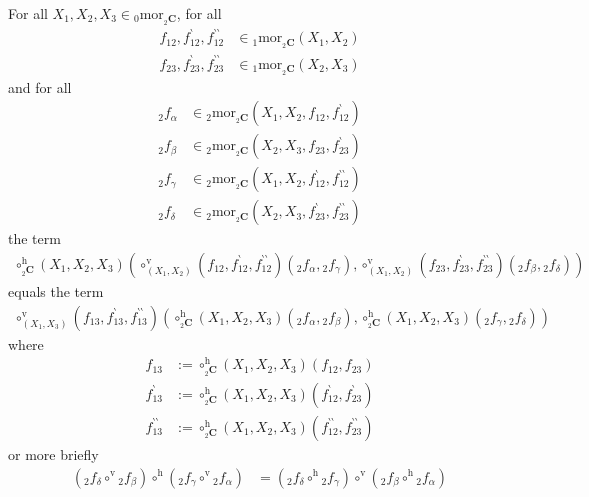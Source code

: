 \begin{thm}
\label{thm:compverthor}
For all $X_{1},X_{2},X_{3} \in {}_{0}\mathrm{mor}_{{}_{2}\mathbf{C}}$, for all
\begin{align*}
  f_{12},f_{12}^{\backprime},f_{12}^{\backprime\backprime}
  &\in
  {}_{1}\mathrm{mor}_{{}_{2}\mathbf{C}}(X_{1},X_{2})
  \\
  f_{23},f_{23}^{\backprime},f_{23}^{\backprime\backprime}
  &\in
  {}_{1}\mathrm{mor}_{{}_{2}\mathbf{C}}(X_{2},X_{3})
\end{align*}
and for all
\begin{align*}
  {}_{2}f_{\alpha}
  &\in
  {}_{2}\mathrm{mor}_{{}_{2}\mathbf{C}}(X_{1},X_{2},f_{12},f_{12}^{\backprime})
  \\
  {}_{2}f_{\beta}
  &\in
  {}_{2}\mathrm{mor}_{{}_{2}\mathbf{C}}(X_{2},X_{3},f_{23},f_{23}^{\backprime})
  \\
  {}_{2}f_{\gamma}
  &\in
  {}_{2}\mathrm{mor}_{{}_{2}\mathbf{C}}(X_{1},X_{2},f_{12}^{\backprime},f_{12}^{\backprime\backprime})
  \\
  {}_{2}f_{\delta}
  &\in
  {}_{2}\mathrm{mor}_{{}_{2}\mathbf{C}}(X_{2},X_{3},f_{23}^{\backprime},f_{23}^{\backprime\backprime})
\end{align*}
the term
\begin{align*}
  \circ_{{}_{2}\mathbf{C}}^{\textrm{h}}
  (X_{1},X_{2},X_{3})
  \left(
    \circ_{(X_{1},X_{2})}^{\textrm{v}}
    (f_{12},f_{12}^{\backprime},f_{12}^{\backprime\backprime})
    ({}_{2}f_{\alpha},{}_{2}f_{\gamma}),
    \circ_{(X_{1},X_{2})}^{\textrm{v}}
    (f_{23},f_{23}^{\backprime},f_{23}^{\backprime\backprime})
    ({}_{2}f_{\beta},{}_{2}f_{\delta})
  \right)
\end{align*}
equals the term
\begin{align*}
  \circ_{(X_{1},X_{3})}^{\textrm{v}}
  (f_{13},f_{13}^{\backprime},f_{13}^{\backprime\backprime})
  \left(
    \circ_{{}_{2}\mathbf{C}}^{\textrm{h}}
    (X_{1},X_{2},X_{3})
    ({}_{2}f_{\alpha},{}_{2}f_{\beta}),
    \circ_{{}_{2}\mathbf{C}}^{\textrm{h}}
    (X_{1},X_{2},X_{3})
    ({}_{2}f_{\gamma},{}_{2}f_{\delta})
  \right)
\end{align*}
where
\begin{align*}
  f_{13}
  &:=
  \circ_{{}_{2}\mathbf{C}}^{\textrm{h}}
  (X_{1},X_{2},X_{3})
  (f_{12},f_{23})
  \\
  f_{13}^{\backprime}
  &:=
  \circ_{{}_{2}\mathbf{C}}^{\textrm{h}}
  (X_{1},X_{2},X_{3})
  (f_{12}^{\backprime},f_{23}^{\backprime})
  \\
  f_{13}^{\backprime\backprime}
  &:=
  \circ_{{}_{2}\mathbf{C}}^{\textrm{h}}
  (X_{1},X_{2},X_{3})
  (f_{12}^{\backprime\backprime},f_{23}^{\backprime\backprime})
\end{align*}
or more briefly
\begin{align*}
  \left(
    {}_{2}f_{\delta}
    \circ^{\textrm{v}}
    {}_{2}f_{\beta}
  \right)
  \circ^{\textrm{h}}
  \left(
    {}_{2}f_{\gamma}
    \circ^{\textrm{v}}
    {}_{2}f_{\alpha}
  \right)
  &=
  \left(
    {}_{2}f_{\delta}
    \circ^{\textrm{h}}
    {}_{2}f_{\gamma}
  \right)
  \circ^{\textrm{v}}
  \left(
    {}_{2}f_{\beta}
    \circ^{\textrm{h}}
    {}_{2}f_{\alpha}
  \right)
\end{align*}
\end{thm}
